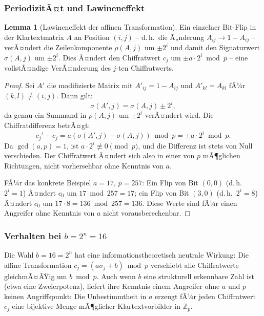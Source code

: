 ﻿\documentclass[a4paper,12pt]{scrreprt}
\theoremstyle{definition}
\newtheorem{lemma}{Lemma}[section]
\begin{document}
\subsubsection{PeriodizitÃ¤t und Lawineneffekt}

\begin{lemma}[Lawineneffekt der affinen Transformation]
\label{lem:lawine}
Ein einzelner Bit-Flip in der Klartextmatrix $A$ an Position $(i, j)$ -- d.\,h.\ die Ã„nderung $A_{ij} \to 1 - A_{ij}$ -- verÃ¤ndert die Zeilenkomponente $\rho(A,j)$ um $\pm 2^i$ und damit den Signaturwert $\sigma(A,j)$ um $\pm 2^i$. Dies Ã¤ndert den Chiffratwert $c_j$ um $\pm a \cdot 2^i \bmod p$ -- eine vollstÃ¤ndige VerÃ¤nderung des $j$-ten Chiffratwerts.
\end{lemma}

\begin{proof}
Sei $A'$ die modifizierte Matrix mit $A'_{ij} = 1 - A_{ij}$ und $A'_{kl} = A_{kl}$ fÃ¼r $(k,l) \neq (i,j)$. Dann gilt:
\[
\sigma(A',j) = \sigma(A,j) \pm 2^i,
\]
da genau ein Summand in $\rho(A,j)$ um $\pm 2^i$ verÃ¤ndert wird. Die Chiffratdifferenz betrÃ¤gt:
\[
c_j' - c_j = a(\sigma(A',j) - \sigma(A,j)) \bmod p = \pm a \cdot 2^i \bmod p.
\]
Da $\gcd(a,p)=1$, ist $a \cdot 2^i \not\equiv 0 \pmod p$, und die Differenz ist stets von Null verschieden. Der Chiffratwert Ã¤ndert sich also in einer von $p$ mÃ¶glichen Richtungen, nicht vorhersehbar ohne Kenntnis von $a$.

FÃ¼r das konkrete Beispiel $a=17$, $p=257$: Ein Flip von Bit $(0,0)$ (d.\,h.\ $2^i = 1$) Ã¤ndert $c_0$ um $17 \bmod 257 = 17$; ein Flip von Bit $(3,0)$ (d.\,h.\ $2^i = 8$) Ã¤ndert $c_0$ um $17 \cdot 8 = 136 \bmod 257 = 136$. Diese Werte sind fÃ¼r einen Angreifer ohne Kenntnis von $a$ nicht vorausberechenbar.
\end{proof}

\subsubsection{Verhalten bei $b = 2^n = 16$}

Die Wahl $b = 16 = 2^n$ hat eine informationstheoretisch neutrale Wirkung: Die affine Transformation $c_j = (a\sigma_j + b) \bmod p$ verschiebt alle Chiffratwerte gleichmÃ¤ÃŸig um $b \bmod p$. Auch wenn $b$ eine strukturell erkennbare Zahl ist (etwa eine Zweierpotenz), liefert ihre Kenntnis einem Angreifer ohne $a$ und $p$ keinen Angriffspunkt: Die Unbestimmtheit in $a$ erzeugt fÃ¼r jeden Chiffratwert $c_j$ eine bijektive Menge mÃ¶glicher Klartextvorbilder in $\mathbb{Z}_p$.
\end{document}
